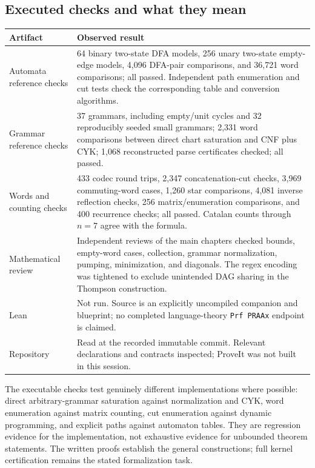 \subsection{Executed checks and what they mean}

\begin{longtable}{@{}p{}p{}@{}}
\toprule
Artifact & Observed result\\\midrule\endhead
Automata reference checks & 64 binary two-state DFA models, 256 unary
two-state empty-edge models, 4,096 DFA-pair comparisons, and 36,721 word
comparisons; all passed. Independent path enumeration and cut tests check
the corresponding table and conversion algorithms.\\
Grammar reference checks & 37 grammars, including empty/unit cycles and
32 reproducibly seeded small grammars; 2,331 word comparisons between
direct chart saturation and CNF plus CYK; 1,068 reconstructed parse
certificates checked; all passed.\\
Words and counting checks & 433 codec round trips, 2,347 concatenation-cut
checks, 3,969 commuting-word cases, 1,260 star comparisons, 4,081 inverse
reflection checks, 256 matrix/enumeration comparisons, and 400 recurrence
checks; all passed. Catalan counts through $n=7$ agree with the formula.\\
Mathematical review & Independent reviews of the main chapters checked
bounds, empty-word cases, collection, grammar normalization, pumping,
minimization, and diagonals. The regex encoding was tightened to exclude
unintended DAG sharing in the Thompson construction.\\
Lean & Not run. Source is an explicitly uncompiled companion and blueprint;
no completed language-theory \texttt{Prf PRAAx} endpoint is claimed.\\
Repository & Read at the recorded immutable commit. Relevant declarations
and contracts inspected; ProveIt was not built in this session.\\
\bottomrule
\end{longtable}

The executable checks test genuinely different implementations where
possible: direct arbitrary-grammar saturation against normalization and
CYK, word enumeration against matrix counting, cut enumeration against
dynamic programming, and explicit paths against automaton tables.
They are regression evidence for the implementation, not exhaustive
evidence for unbounded theorem statements. The written proofs establish
the general constructions; full kernel certification remains the stated
formalization task.

